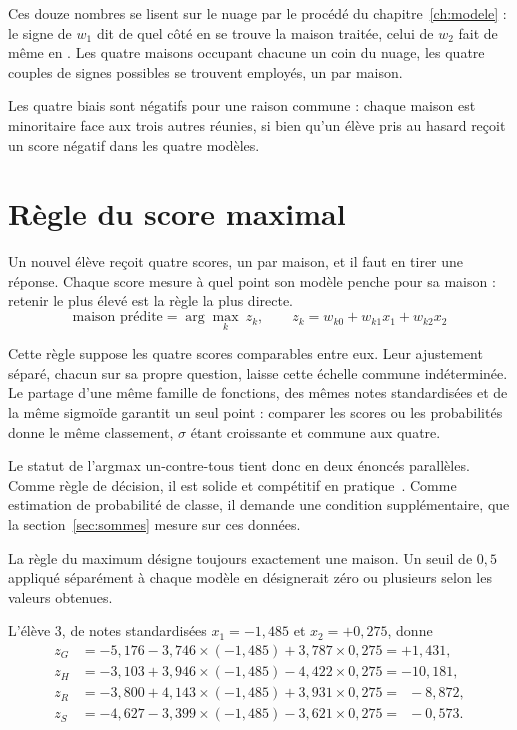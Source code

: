 Ces douze nombres se lisent sur le nuage par le procédé du
chapitre~\ref{ch:modele} : le signe de $w_1$ dit de quel côté en \Herb se
trouve la maison traitée, celui de $w_2$ fait de même en \Runes. Les quatre
maisons occupant chacune un coin du nuage, les quatre couples de signes possibles
se trouvent employés, un par maison.

Les quatre biais sont négatifs pour une raison commune : chaque maison est
minoritaire face aux trois autres réunies, si bien qu'un élève pris au hasard
reçoit un score négatif dans les quatre modèles.

\section{Règle du score maximal}

Un nouvel élève reçoit quatre scores, un par maison, et il faut en tirer une
réponse. Chaque score mesure à quel point son modèle penche pour sa maison :
retenir le plus élevé est la règle la plus directe.
\[
  \text{maison prédite}=\arg\max_{k}\ z_k,
  \qquad z_k=w_{k0}+w_{k1}x_1+w_{k2}x_2
\]

Cette règle suppose les quatre scores comparables entre eux. Leur ajustement
séparé, chacun sur sa propre question, laisse cette échelle commune indéterminée.
Le partage d'une même famille de fonctions, des mêmes notes standardisées et de
la même sigmoïde garantit un seul point : comparer les scores ou les
probabilités donne le même classement, $\sigma$ étant croissante et commune aux
quatre.

Le statut de l'argmax un-contre-tous tient donc en deux énoncés parallèles. Comme
règle de décision, il est solide et compétitif en pratique~\cite{rifkin2004}.
Comme estimation de probabilité de classe, il demande une condition
supplémentaire, que la section~\ref{sec:sommes} mesure sur ces données.

La règle du maximum désigne toujours exactement une maison. Un seuil de $0{,}5$
appliqué séparément à chaque modèle en désignerait zéro ou plusieurs selon les
valeurs obtenues.

\begin{releve}
L'élève $3$, de notes standardisées $x_1=-1{,}485$ et $x_2=+0{,}275$, donne
\begin{align*}
  z_G &= -5{,}176-3{,}746\times(-1{,}485)+3{,}787\times0{,}275 = +1{,}431,\\
  z_H &= -3{,}103+3{,}946\times(-1{,}485)-4{,}422\times0{,}275 = -10{,}181,\\
  z_R &= -3{,}800+4{,}143\times(-1{,}485)+3{,}931\times0{,}275 = \phantom{0}-8{,}872,\\
  z_S &= -4{,}627-3{,}399\times(-1{,}485)-3{,}621\times0{,}275 = \phantom{0}-0{,}573.
\end{align*}
\end{releve}

